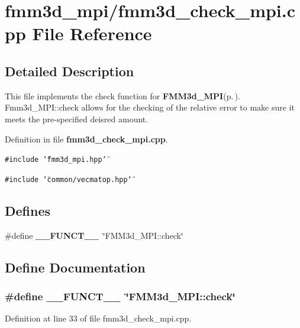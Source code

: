 \section{fmm3d\_\-mpi/fmm3d\_\-check\_\-mpi.cpp File Reference}
\label{fmm3d__check__mpi_8cpp}


\subsection{Detailed Description}
This file implements the check function for {\bf FMM3d\_\-MPI}{\rm (p.\,\pageref{classFMM3d__MPI})}. Fmm3d\_\-MPI::check allows for the checking of the relative error to make sure it meets the pre-specified deisred amount. 

Definition in file {\bf fmm3d\_\-check\_\-mpi.cpp}.

{\tt \#include \char`\"{}fmm3d\_\-mpi.hpp\char`\"{}}\par
{\tt \#include \char`\"{}common/vecmatop.hpp\char`\"{}}\par
\subsection*{Defines}
\begin{CompactItemize}
\item 
\#define {\bf \_\-\_\-FUNCT\_\-\_\-}~\char`\"{}FMM3d\_\-MPI::check\char`\"{}
\end{CompactItemize}


\subsection{Define Documentation}
\subsubsection{\setlength{\rightskip}{0pt plus 5cm}\#define \_\-\_\-FUNCT\_\-\_\-~\char`\"{}FMM3d\_\-MPI::check\char`\"{}}\label{fmm3d__check__mpi_8cpp_2818853adf63a17949cf67d73c1d4473_2818853adf63a17949cf67d73c1d4473}




Definition at line 33 of file fmm3d\_\-check\_\-mpi.cpp.